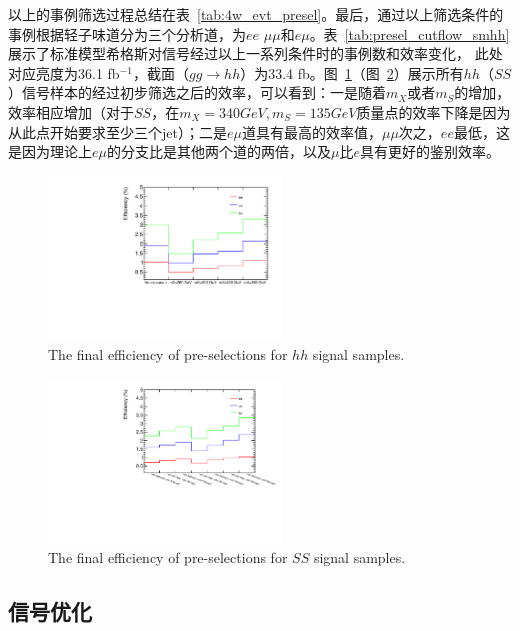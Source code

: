 以上的事例筛选过程总结在表~\ref{tab:4w_evt_presel}。最后，通过以上筛选条件的事例根据轻子味道分为三个分析道，为$ee$
$\mu\mu$和$e\mu$。表~\ref{tab:presel_cutflow_smhh}展示了标准模型希格斯对信号经过以上一系列条件时的事例数和效率变化，
此处对应亮度为36.1 fb$^{-1}$，截面（$gg\rightarrow hh$）为33.4 fb。图~\ref{fig:eff_pre_sel_hh}（图~\ref{fig:eff_pre_sel_SS}）展示所有$hh$（$SS$）信号样本的经过初步筛选之后的效率，可以看到：一是随着$m_X$或者$m_S$的增加，效率相应增加（对于$SS$，在$m_X=340 GeV, m_S=135 GeV$质量点的效率下降是因为从此点开始要求至少三个jet）；二是$e\mu$道具有最高的效率值，$\mu\mu$次之，$ee$最低，这是因为理论上$e\mu$的分支比是其他两个道的两倍，以及$\mu$比$e$具有更好的鉴别效率。



\begin{figure}
\centering
\includegraphics[width=0.55\textwidth, angle =-90]{fig/SigTopo/eff_presel_hh.pdf}
\caption{The final efficiency of pre-selections for $hh$ signal samples.}
\label{fig:eff_pre_sel_hh}
\end{figure}

\begin{figure}
\centering
\includegraphics[width=0.55\textwidth, angle =-90]{fig/SigTopo/eff_presel_SS.pdf}
\caption{The final efficiency of pre-selections for $SS$ signal samples.}
\label{fig:eff_pre_sel_SS}
\end{figure}

\subsection{信号优化}
